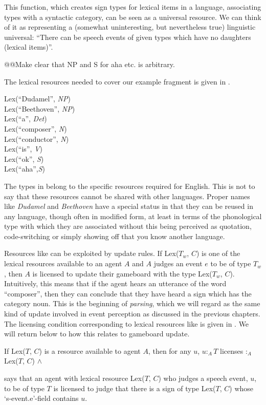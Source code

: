 This function, which creates sign types for lexical items in a
language, associating types with a syntactic category, can be seen as
a universal resource.  We can think of it as representing a (somewhat
uninteresting, but nevertheless true) linguistic universal:  ``There
can be speech events of given types which have 
no daughters (lexical items)''.  
  
   

@@Make clear that NP and S for aha etc. is arbitrary.

The lexical resources needed to cover our example
fragment is given in \nexteg{}.
\begin{ex} 
Lex(``Dudamel'', \textit{NP}) \\
Lex(``Beethoven'', \textit{NP}) \\
Lex(``a'', \textit{Det}) \\
Lex(``composer'', \textit{N}) \\
Lex(``conductor'', \textit{N}) \\
Lex(``is'', \textit{V}) \\
Lex(``ok'', \textit{S}) \\
Lex(``aha'',\textit{S})
\label{ex:gramlexres} 
\end{ex} 
The types in \preveg{} belong to the specific resources required for
English. This is not to say that these resources cannot be shared with
other languages.  Proper names like \textit{Dudamel} and
\textit{Beethoven} have a special status in that they can be reused in
any language, though often in modified form, at least in terms of the
phonological type with which they are associated without this being
perceived as quotation, code-switching or simply showing off that you
know another language. 

Resources like \preveg{} can be exploited by update rules.  If
Lex($T_w$, $C$)
is one of the lexical resources available to an agent $A$
and $A$ judges an event $e$ to be of type $T_w$, then $A$ is
licensed to update their gameboard with the type Lex($T_w$, $C$).
Intuitively, this means that if the agent hears an utterance of the
word ``composer'', then they can conclude that they have heard a sign
which has the category noun.  This is the beginning of
\textit{parsing}, which we will regard as the same kind of update
involved in event perception as discussed in the previous chapters.
The licensing condition corresponding to lexical resources
like \preveg{} is given in \nexteg{}.  We will return below to how
this relates to gameboard update.  
\begin{ex}
If Lex($T$, $C$) is a resource available to agent $A$, then for any
$u$, $u:_A T$ licenses $:_A$ Lex($T$, $C$)
\d{$\wedge$}

\end{ex} 
\preveg{} says that an agent with lexical resource Lex($T$, $C$) who
judges a speech event, $u$, to be of type $T$ is licensed to judge that
there is a sign of type Lex($T$, $C$) whose `s-event.e'-field contains
$u$. 

